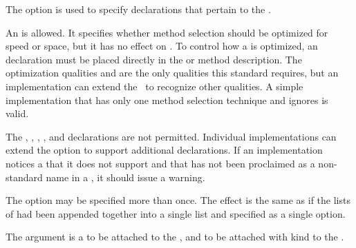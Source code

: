 \itemitem{\bull}
The  option is used to specify declarations that pertain
to the .

An   is allowed.
It specifies whether method selection should be optimized for 
speed or space, but it has no effect on .
To control how a  is optimized, an 
declaration must be placed directly in the  
or method description.  The optimization qualities  and
 are the only qualities this standard requires, but an
implementation can extend the \CLOS\ to recognize other qualities.  
A simple implementation that has only one method selection technique 
and ignores   is valid.
 
The , 
, ,
, and  declarations are not permitted.
Individual implementations can extend the  option to
support additional declarations.
If an implementation notices a  that it does
not support and that has not been proclaimed as a non-standard 
 name in a  , 
it should issue a warning. 

The  option may be specified more than once.
The effect is the same as if the lists of  
had been appended together into a single list and specified as a 
single  option.

\itemitem{\bull} 
The  argument is a 
to be attached to the  , 
and to be attached with kind  to the .
 
